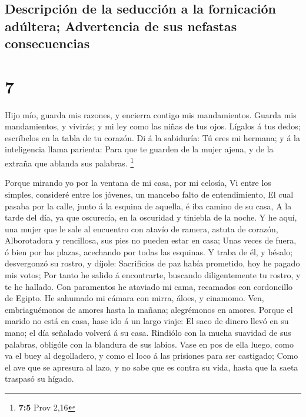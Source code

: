 \hypertarget{descripciuxf3n-de-la-seducciuxf3n-a-la-fornicaciuxf3n-aduxfaltera-advertencia-de-sus-nefastas-consecuencias}{%
\subsection{Descripción de la seducción a la fornicación adúltera;
Advertencia de sus nefastas
consecuencias}\label{descripciuxf3n-de-la-seducciuxf3n-a-la-fornicaciuxf3n-aduxfaltera-advertencia-de-sus-nefastas-consecuencias}}

\hypertarget{section-6}{%
\section{7}\label{section-6}}

 Hijo mío, guarda mis razones, y encierra contigo mis
mandamientos.  Guarda mis mandamientos, y vivirás; y mi
ley como las niñas de tus ojos.  Lígalos á tus dedos;
escríbelos en la tabla de tu corazón.  Di á la sabiduría:
Tú eres mi hermana; y á la inteligencia llama parienta: 
Para que te guarden de la mujer ajena, y de la extraña que ablanda sus
palabras. \footnote{\textbf{7:5} Prov 2,16}

 Porque mirando yo por la ventana de mi casa, por mi
celosía,  Vi entre los simples, consideré entre los
jóvenes, un mancebo falto de entendimiento,  El cual
pasaba por la calle, junto á la esquina de aquella, é iba camino de su
casa,  A la tarde del día, ya que oscurecía, en la
oscuridad y tiniebla de la noche.  Y he aquí, una mujer
que le sale al encuentro con atavío de ramera, astuta de corazón,
 Alborotadora y rencillosa, sus pies no pueden estar en
casa;  Unas veces de fuera, ó bien por las plazas,
acechando por todas las esquinas.  Y traba de él, y
bésalo; desvergonzó su rostro, y díjole:  Sacrificios de
paz había prometido, hoy he pagado mis votos;  Por tanto
he salido á encontrarte, buscando diligentemente tu rostro, y te he
hallado.  Con paramentos he ataviado mi cama, recamados
con cordoncillo de Egipto.  He sahumado mi cámara con
mirra, áloes, y cinamomo.  Ven, embriaguémonos de amores
hasta la mañana; alegrémonos en amores.  Porque el marido
no está en casa, hase ido á un largo viaje:  El saco de
dinero llevó en su mano; el día señalado volverá á su casa.
 Rindiólo con la mucha suavidad de sus palabras, obligóle
con la blandura de sus labios.  Vase en pos de ella
luego, como va el buey al degolladero, y como el loco á las prisiones
para ser castigado;  Como el ave que se apresura al lazo,
y no sabe que es contra su vida, hasta que la saeta traspasó su hígado.

